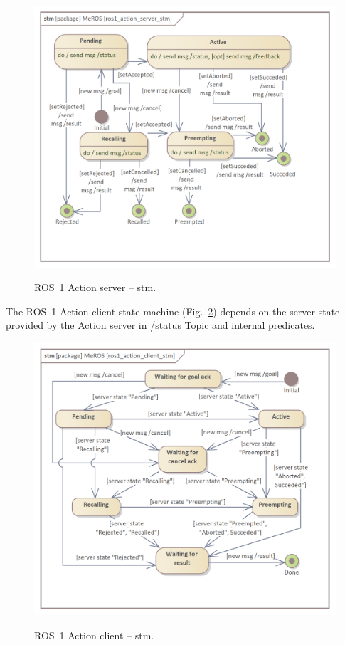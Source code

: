 \documentclass{ieeeaccess}
\begin{document}
	\begin{figure}[htb]
		\centering
		\begin{center}
			{\includegraphics[scale=0.7]{img/meros_pkg/ros1_action_server_stm.png}}
		\end{center}
		\caption{ROS~1 Action server -- stm.} 
		\label{fig:ros1_action_server_stm}
	\end{figure}
	
	The ROS~1 Action client state machine (Fig.~\ref{fig:ros1_action_client_stm}) depends on the server state provided by the Action server in /status Topic and internal predicates. 
		
	\begin{figure}[htb]
		\centering
		\begin{center}
			{\includegraphics[scale=0.7]{img/meros_pkg/ros1_action_client_stm.png}}
		\end{center}
		\caption{ROS~1 Action client -- stm.}
		\label{fig:ros1_action_client_stm}
	\end{figure}
	
\end{document}
